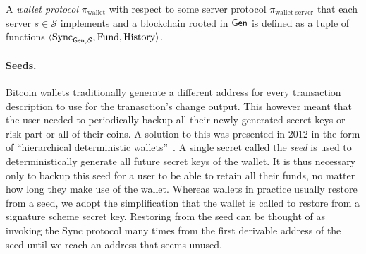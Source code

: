 \begin{definition}
A \emph{wallet protocol} $\pi_\text{wallet}$ with respect to some server protocol $\pi_\text{wallet-server}$ that each server $s \in \mathcal{S}$ implements and a blockchain rooted in $\textsf{Gen}$ is defined as a tuple of functions $\langle\text{Sync}_{\textsf{Gen}, \mathcal{S}}, \text{Fund}, \text{History}\rangle$.
\end{definition}

\paragraph{Seeds.}
Bitcoin wallets traditionally generate a different address for every transaction description to use for the tranasction's change output. This however meant that the user needed to periodically backup all their newly generated secret keys or risk part or all of their coins. A solution to this was presented in 2012 in the form of ``hierarchical deterministic wallets''~\cite{bip32}. A single secret called the \emph{seed} is used to deterministically generate all future secret keys of the wallet. It is thus necessary only to backup this seed for a user to be able to retain all their funds, no matter how long they make use of the wallet. Whereas wallets in practice usually restore from a seed, we adopt the simplification that the wallet is called to restore from a signature scheme secret key. Restoring from the seed can be thought of as invoking the Sync protocol many times from the first derivable address of the seed until we reach an address that seems unused.
